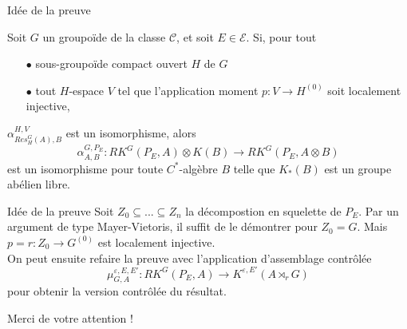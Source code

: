 \begin{frame}{Idée de la preuve}
\begin{thmfr}
Soit $G$ un groupoïde de la classe $\mathcal C$, et soit $E\in\mathcal E$. Si, pour tout 
\begin{itemize}
\item[$\bullet$] sous-groupoïde compact ouvert $H$ de $G$
\item[$\bullet$] tout $H$-espace $V$ tel que l'application moment $p : V\rightarrow H^{(0)}$ soit localement injective,
\end{itemize} 
$\alpha_{Res_H^G(A),B}^{H,V}$ est un isomorphisme, alors 
\[\alpha_{A,B}^{G,P_E}: RK^G(P_E,A)\otimes K(B)\rightarrow RK^G(P_E,A\otimes B) \] 
est un isomorphisme pour toute $C^*$-algèbre $B$ telle que $K_*(B)$ est un groupe abélien libre.\\
\end{thmfr}
\end{frame}

\begin{frame}{Idée de la preuve}
Soit $Z_0 \subseteq ...\subseteq Z_n$ la décompostion en squelette de $P_E$. Par un argument de type Mayer-Vietoris, il suffit de le démontrer pour $Z_0 = G$. Mais $p =r : Z_0 \rightarrow G^{(0)} $ est localement injective. \\
\vspace{0.3 cm}
On peut ensuite refaire la preuve avec l'application d'assemblage contrôlée
\[\mu_{G,A}^{\varepsilon, E,E'} : RK^G(P_E,A)\rightarrow K^{\varepsilon,E'}(A\rtimes_r G)\]
pour obtenir la version contrôlée du résultat.
\end{frame}

\begin{frame}{}
Merci de votre attention !
\end{frame}
